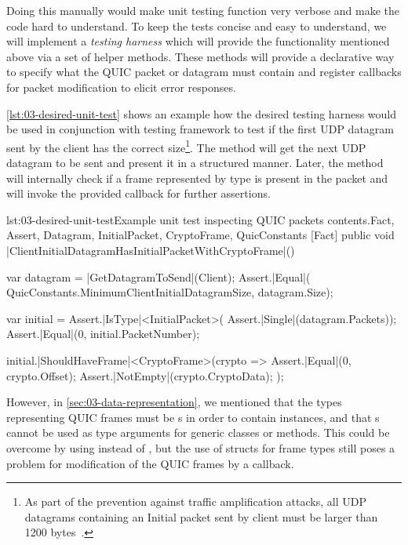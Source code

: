 Doing this manually would make unit testing function very verbose and make the code hard to
understand. To keep the tests concise and easy to understand, we will implement a \textit{testing
harness} which will provide the functionality mentioned above via a set of helper methods. These
methods will provide a declarative way to specify what the QUIC packet or datagram must contain and
register callbacks for packet modification to elicit error responses.

\autoref{lst:03-desired-unit-test} shows an example how the desired testing harness would be used in
conjunction with \xUnit{} testing framework to test if the first UDP datagram sent by the client has
the correct size\footnote{As part of the prevention against traffic amplification attacks, all UDP
datagrams containing an Initial packet sent by client must be larger than 1200
bytes~\autocite[Section~8.1]{draft-ietf-quic-transport}.}. The  method
will get the next UDP datagram to be sent and present it in a structured manner. Later, the
 method will internally check if a frame represented by
 type is present in the packet and will invoke the provided callback for further
assertions.

\begin{myListingCsharpNoPageBreak}{lst:03-desired-unit-test}{Example unit test inspecting QUIC packets contents.}{Fact, Assert, Datagram, InitialPacket, CryptoFrame, QuicConstants}{}
    [Fact]
    public void |ClientInitialDatagramHasInitialPacketWithCryptoFrame|()
    {
        var datagram = |GetDatagramToSend|(Client);
        Assert.|Equal|(
            QuicConstants.MinimumClientInitialDatagramSize,
            datagram.Size);

        var initial = Assert.|IsType|<InitialPacket>(
            Assert.|Single|(datagram.Packets));
        Assert.|Equal|(0, initial.PacketNumber);

        initial.|ShouldHaveFrame|<CryptoFrame>(crypto =>
        {
            Assert.|Equal|(0, crypto.Offset);
            Assert.|NotEmpty|(crypto.CryptoData);
        });
    }
\end{myListingCsharpNoPageBreak}

However, in \autoref{sec:03-data-representation}, we mentioned that the types representing QUIC
frames must be s in order to contain  instances, and that
s cannot be used as type arguments for generic classes or methods. This could be
overcome by using  instead of , but the use of structs for
frame types still poses a problem for modification of the QUIC frames by a callback.

